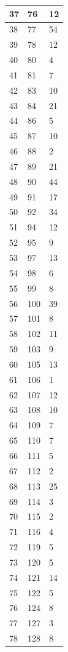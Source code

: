 \begin{tabular}{p{}p{}p{}}
37 & 76 & 12 \\
\hline
38 & 77 & 54 \\
\hline
39 & 78 & 12 \\
\hline
40 & 80 & 4 \\
\hline
41 & 81 & 7 \\
\hline
42 & 83 & 10 \\
\hline
43 & 84 & 21 \\
\hline
44 & 86 & 5 \\
\hline
45 & 87 & 10 \\
\hline
46 & 88 & 2 \\
\hline
47 & 89 & 21 \\
\hline
48 & 90 & 44 \\
\hline
49 & 91 & 17 \\
\hline
50 & 92 & 34 \\
\hline
51 & 94 & 12 \\
\hline
52 & 95 & 9 \\
\hline
53 & 97 & 13 \\
\hline
54 & 98 & 6 \\
\hline
55 & 99 & 8 \\
\hline
56 & 100 & 39 \\
\hline
57 & 101 & 8 \\
\hline
58 & 102 & 11 \\
\hline
59 & 103 & 9 \\
\hline
60 & 105 & 13 \\
\hline
61 & 106 & 1 \\
\hline
62 & 107 & 12 \\
\hline
63 & 108 & 10 \\
\hline
64 & 109 & 7 \\
\hline
65 & 110 & 7 \\
\hline
66 & 111 & 5 \\
\hline
67 & 112 & 2 \\
\hline
68 & 113 & 25 \\
\hline
69 & 114 & 3 \\
\hline
70 & 115 & 2 \\
\hline
71 & 116 & 4 \\
\hline
72 & 119 & 5 \\
\hline
73 & 120 & 5 \\
\hline
74 & 121 & 14 \\
\hline
75 & 122 & 5 \\
\hline
76 & 124 & 8 \\
\hline
77 & 127 & 3 \\
\hline
78 & 128 & 8 \\

\end{tabular}
